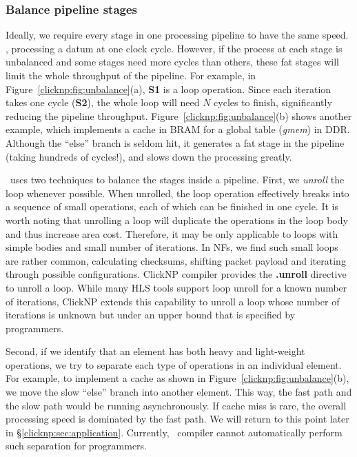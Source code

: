 \subsubsection{Balance pipeline stages}
Ideally, we require every stage in one processing pipeline to have the same speed. \ie, processing a datum at one clock cycle.
However, if the process at each stage is unbalanced and some stages need more cycles than others, these fat stages will
limit the whole throughput of the pipeline.  
For example, in Figure~\ref{clicknp:fig:unbalance}(a), \textbf{S1} is a loop operation. 
Since each iteration takes one cycle (\textbf{S2}), the whole loop will need $N$ cycles to finish, significantly reducing the pipeline
throughput.
Figure~\ref{clicknp:fig:unbalance}(b) shows another example, which implements a cache in BRAM for a global table (\textit{gmem}) in DDR.
Although the ``else'' branch is seldom hit, it generates a fat stage in the 
pipeline (taking hundreds of cycles!), and slows down
the processing greatly.

\name\ uses two techniques to balance the stages inside a pipeline. First, we \textit{unroll} the loop whenever possible. 
When unrolled, the loop operation effectively breaks into a sequence of small operations, each of which can be finished in one cycle.
It is worth noting that unrolling a loop will duplicate the operations in the loop body and thus increase area cost. 
Therefore, it may be only applicable to loops with simple bodies and 
small number of iterations. 
In NFs, we find such small loops are rather common, \eg calculating checksums, shifting packet payload and iterating through possible configurations.
ClickNP compiler provides the \textbf{.unroll} directive to unroll a loop. 
%
While many HLS tools support loop unroll for a known number of iterations, 
ClickNP extends this capability to unroll a loop whose  
number of iterations is unknown but under an upper bound 
that is specified by programmers.

Second, if we identify that an element has both heavy and light-weight operations, we try to separate each type of operations in an individual element.
For example, to implement a cache as shown in Figure~\ref{clicknp:fig:unbalance}(b), we move the slow ``else'' branch into another element.
This way, the fast path and the slow path would be running asynchronously.
If cache miss is rare, the overall processing speed is dominated by the fast path.
We will return to this point later in \S\ref{clicknp:sec:application}.
Currently, \name\ compiler cannot automatically perform such separation for 
programmers.

